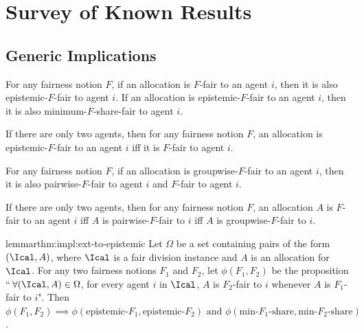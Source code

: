 \section{Survey of Known Results}
\label{sec:old-impls}

\subsection{Generic Implications}

\begin{remark}
\label{thm:impl:epistemic}
For any fairness notion $F$, if an allocation is $F$-fair to an agent $i$,
then it is also epistemic-$F$-fair to agent $i$.
If an allocation is epistemic-$F$-fair to an agent $i$,
then it is also minimum-$F$-share-fair to agent $i$.
\end{remark}

\begin{remark}
\label{thm:impl:epistemic-n2}
If there are only two agents, then for any fairness notion $F$,
an allocation is epistemic-$F$-fair to an agent $i$
iff it is $F$-fair to agent $i$.
\end{remark}

\begin{remark}
\label{thm:impl:groupwise}
For any fairness notion $F$, if an allocation is groupwise-$F$-fair to an agent $i$,
then it is also pairwise-$F$-fair to agent $i$ and $F$-fair to agent $i$.
\end{remark}

\begin{remark}
\label{thm:impl:groupwise-n2}
If there are only two agents, then for any fairness notion $F$,
an allocation $A$ is $F$-fair to an agent $i$
iff $A$ is pairwise-$F$-fair to $i$ iff $A$ is groupwise-$F$-fair to $i$.
\end{remark}

\begin{restatable}{lemma}{rthm:impl:ext-to-epistemic}
\label{thm:impl:ext-to-epistemic}
Let $\Omega$ be a set containing pairs of the form $(\Ical, A)$,
where $\Ical$ is a fair division instance and $A$ is an allocation for $\Ical$.
For any two fairness notions $F_1$ and $F_2$, let $\phi(F_1, F_2)$ be the proposition
``\,$\forall (\Ical, A) \in \Omega$, for every agent $i$ in $\Ical$,
$A$ is $F_2$-fair to $i$ whenever $A$ is $F_1$-fair to $i$". Then
$\phi(F_1, F_2) \implies \phi(\textrm{epistemic-}F_1, \textrm{epistemic-}F_2)
\textrm{ and } \phi(\textrm{min-}F_1\textrm{-share}, \textrm{min-}F_2\textrm{-share})$.
\end{restatable}

